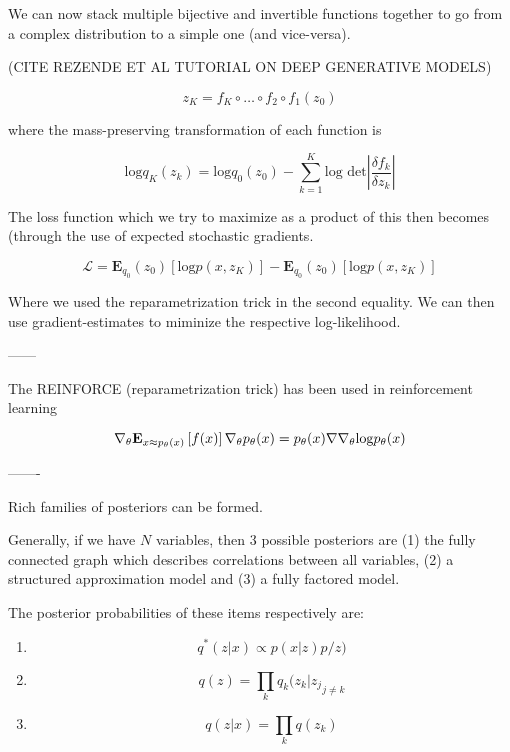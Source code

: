\documentclass[a4paper,12pt,twoside,openright]{report}
\begin{document}
We can now stack multiple bijective and invertible functions together to go from a complex distribution to a simple one (and vice-versa).

(CITE REZENDE ET AL TUTORIAL ON DEEP GENERATIVE MODELS)

\begin{equation}
z_K = f_K \circ \ldots \circ f_2 \circ f_1(z_0)
\end{equation}

where the mass-preserving transformation of each function is

\begin{equation}
\text{log} q_K(z_k) = \text{log} q_0(z_0) - \sum_{k=1}^{K} \text{log det} \left| \frac{\delta f_k}{\delta z_k} \right|
\end{equation}

The loss function which we try to maximize as a product of this then becomes (through the use of expected stochastic gradients.

\begin{equation}
\mathcal{L} =  \mathbf{E}_{q_0}(z_0) \left[ \text{log} p(x, z_K) \right]- \mathbf{E}_{q_0}(z_0) \left[ \text{log} p(x, z_K) \right]
\end{equation}

%  

Where we used the reparametrization trick in the second equality. We can then use gradient-estimates to miminize the respective log-likelihood.


------

The REINFORCE (reparametrization trick) has been used in reinforcement learning

\begin{equation}
\nabla_\theta \mathbf{E}_{x \approx p_\theta(x)} \left[ f(x) \right] \\
\nabla_\theta p_\theta(x) = p_\theta(x) \nabla \nabla_\theta \text{log} p_\theta(x)
\end{equation}


-------

Rich families of posteriors can be formed.

Generally, if we have $N$ variables, then 3 possible posteriors are (1) the fully connected graph which describes correlations between all variables, (2) a structured approximation model and (3) a fully factored model.

The posterior probabilities of these items respectively are:

\begin{enumerate}
\item $$ q^* (z | x) \propto p(x|z)p/z)$$
\item $$ q(z) = \prod_k q_k(z_k | {z_j}_{j \neq k}  $$
\item $$ q(z|x) = \prod_k q(z_k) $$
\end{enumerate}
\end{document}
